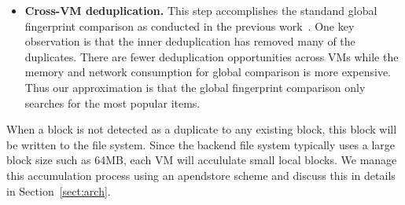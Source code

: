 \begin{itemize}
%

\item \textbf{Cross-VM deduplication.}
This step accomplishes the standand global fingerprint  comparison as conducted
in the previous work~\cite{??}.
One key observation is that the inner deduplication has removed many of the duplicates.
There are fewer deduplication opportunities across VMs while the memory and network
consumption for global comparison is more expensive.
Thus our approximation is that the global fingerprint comparison only searches for the most popular items. 
\end{itemize}

When a block is not detected as a duplicate to any existing block, this block will be written
to the file system. Since the backend file system typically uses a large block size such as 64MB, each VM will 
accululate small local blocks. We manage this accumulation process using an apendstore  scheme
and discuss this in details in Section~\ref{sect:arch}.


